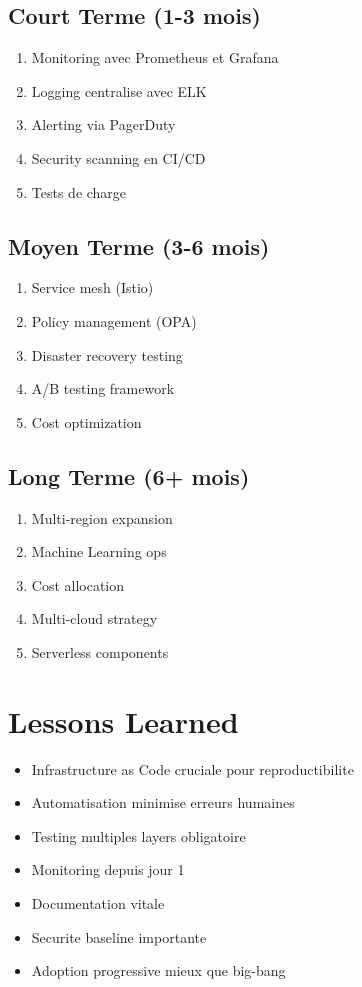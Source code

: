 \documentclass[12pt,a4paper]{report}
\begin{document}
\subsection{Court Terme (1-3 mois)}

\begin{enumerate}
    \item Monitoring avec Prometheus et Grafana
    \item Logging centralise avec ELK
    \item Alerting via PagerDuty
    \item Security scanning en CI/CD
    \item Tests de charge
\end{enumerate}

\subsection{Moyen Terme (3-6 mois)}

\begin{enumerate}
    \item Service mesh (Istio)
    \item Policy management (OPA)
    \item Disaster recovery testing
    \item A/B testing framework
    \item Cost optimization
\end{enumerate}

\subsection{Long Terme (6+ mois)}

\begin{enumerate}
    \item Multi-region expansion
    \item Machine Learning ops
    \item Cost allocation
    \item Multi-cloud strategy
    \item Serverless components
\end{enumerate}

\section{Lessons Learned}

\begin{itemize}
    \item Infrastructure as Code cruciale pour reproductibilite
    \item Automatisation minimise erreurs humaines
    \item Testing multiples layers obligatoire
    \item Monitoring depuis jour 1
    \item Documentation vitale
    \item Securite baseline importante
    \item Adoption progressive mieux que big-bang
\end{itemize}
\end{document}
